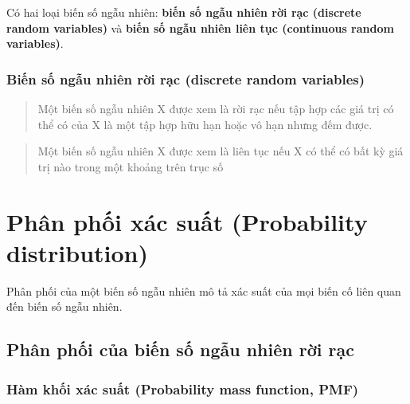 \documentclass[
]{book}
\begin{document}
Có hai loại biến số ngẫu nhiên: \textbf{biến số ngẫu nhiên rời rạc (discrete random variables)} và \textbf{biến số ngẫu nhiên liên tục (continuous random variables)}.

\hypertarget{biux1ebfn-sux1ed1-ngux1eabu-nhiuxean-rux1eddi-rux1ea1c-discrete-random-variables}{%
\subsubsection{Biến số ngẫu nhiên rời rạc (discrete random variables)}\label{biux1ebfn-sux1ed1-ngux1eabu-nhiuxean-rux1eddi-rux1ea1c-discrete-random-variables}}

\begin{quote}
Một biến số ngẫu nhiên X được xem là rời rạc nếu tập hợp các giá trị có thể có của X là một tập hợp hữu hạn hoặc vô hạn nhưng đếm được.
\end{quote}

\begin{quote}
Một biến số ngẫu nhiên X được xem là liên tục nếu X có thể có bất kỳ giá trị nào trong một khoảng trên trục số
\end{quote}

\hypertarget{phuxe2n-phux1ed1i-xuxe1c-suux1ea5t-probability-distribution}{%
\section{Phân phối xác suất (Probability distribution)}\label{phuxe2n-phux1ed1i-xuxe1c-suux1ea5t-probability-distribution}}

Phân phối của một biến số ngẫu nhiên mô tả xác suất của mọi biến cố liên quan đến biến số ngẫu nhiên.

\hypertarget{phuxe2n-phux1ed1i-cux1ee7a-biux1ebfn-sux1ed1-ngux1eabu-nhiuxean-rux1eddi-rux1ea1c}{%
\subsection{Phân phối của biến số ngẫu nhiên rời rạc}\label{phuxe2n-phux1ed1i-cux1ee7a-biux1ebfn-sux1ed1-ngux1eabu-nhiuxean-rux1eddi-rux1ea1c}}

\hypertarget{huxe0m-khux1ed1i-xuxe1c-suux1ea5t-probability-mass-function-pmf}{%
\subsubsection{Hàm khối xác suất (Probability mass function, PMF)}\label{huxe0m-khux1ed1i-xuxe1c-suux1ea5t-probability-mass-function-pmf}}
\end{document}
